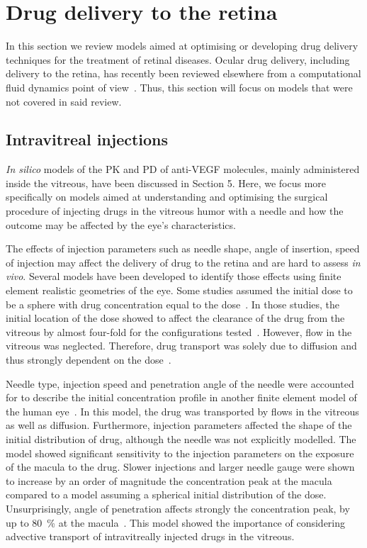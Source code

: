 \documentclass{article}
\begin{document}
\section{Drug delivery to the retina}\label{sec:DrugDelivery}

In this section we review models aimed at optimising or developing drug delivery techniques for the treatment of retinal diseases.
Ocular drug delivery, including delivery to the retina, has recently been reviewed elsewhere from a computational fluid dynamics point of view~\cite{Bhandari_2021}.
Thus, this section will focus on models that were not covered in said review.

\subsection{Intravitreal injections}

\textit{In silico} models of the PK and PD of anti-VEGF molecules, mainly administered inside the vitreous, have been discussed in Section 5.
Here, we focus more specifically on models aimed at understanding and optimising the surgical procedure of injecting drugs in the vitreous humor with a needle and how the outcome may be affected by the eye's characteristics.

The effects of injection parameters such as needle shape, angle of insertion, speed of injection may affect the delivery of drug to the retina and are hard to assess \textit{in vivo}.
Several models have been developed to identify those effects using finite element realistic geometries of the eye.
Some studies assumed the initial dose to be a sphere with drug concentration equal to the dose~\cite{Friedrich_1997,Friedrich_1997a}.
In those studies, the initial location of the dose showed to affect the clearance of the drug from the vitreous by almost four-fold for the configurations tested~\cite{Friedrich_1997}.
However, flow in the vitreous was neglected.
Therefore, drug transport was solely due to diffusion and thus strongly dependent on the dose~\cite{Friedrich_1997}.

Needle type, injection speed and penetration angle of the needle were accounted for to describe the initial concentration profile in another finite element model of the human eye~\cite{Jooybar_2014}.
In this model, the drug was transported by flows in the vitreous as well as diffusion.
Furthermore, injection parameters affected the shape of the initial distribution of drug, although the needle was not explicitly modelled.
The model showed significant sensitivity to the injection parameters on the exposure of the macula to the drug.
Slower injections and larger needle gauge were shown to increase by an order of magnitude the concentration peak at the macula compared to a model assuming a spherical initial distribution of the dose.
Unsurprisingly, angle of penetration affects strongly the concentration peak, by up to \SI{80}{\percent} at the macula~\cite{Jooybar_2014}.
This model showed the importance of considering advective transport of intravitreally injected drugs in the vitreous. 
\end{document}
